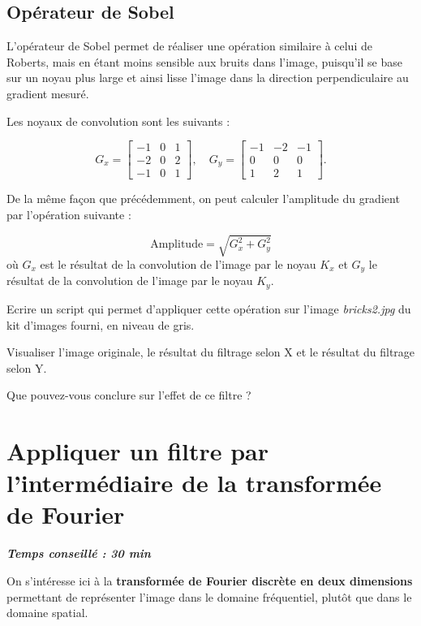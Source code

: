 \documentclass[a4paper,11pt,titlepage]{article} %
\begin{document}
\subsection{Opérateur de Sobel}

L'opérateur de Sobel permet de réaliser une opération similaire à celui de Roberts, mais en étant moins sensible aux bruits dans l'image, puisqu'il se base sur un noyau plus large et ainsi lisse l'image dans la direction perpendiculaire au gradient mesuré.

Les noyaux de convolution sont les suivants :

$$G_x = \begin{bmatrix}
-1 & 0 & 1 \\
-2 & 0 & 2 \\
-1 & 0 & 1 
\end{bmatrix},
\quad
G_y =
\begin{bmatrix}
-1 & -2 & -1 \\
0 & 0 & 0 \\
1 & 2 & 1 
\end{bmatrix}.
$$

De la même façon que précédemment, on peut calculer l'amplitude du gradient par l'opération suivante : 

$$\text{Amplitude} = \sqrt{G_x^2 + G_y^2}$$ où $G_x$ est le résultat de la convolution de l'image par le noyau $K_x$ et $G_y$ le résultat de la convolution de l'image par le noyau $K_y$.

\medskip

\Manip Ecrire un script qui permet d'appliquer cette opération sur l'image \textsl{bricks2.jpg} du kit d'images fourni, en niveau de gris.

\Manip Visualiser l'image originale, le résultat du filtrage selon X et le résultat du filtrage selon Y.

\Quest Que pouvez-vous conclure sur l'effet de ce filtre ?

\section{Appliquer un filtre par l'intermédiaire de la transformée de Fourier}

\begin{center} \textbf{\textit{Temps conseillé : 30 min}} \end{center}

On s'intéresse ici à la \textbf{transformée de Fourier discrète en deux dimensions} permettant de représenter l'image dans le domaine fréquentiel, plutôt que dans le domaine spatial.
\end{document}
